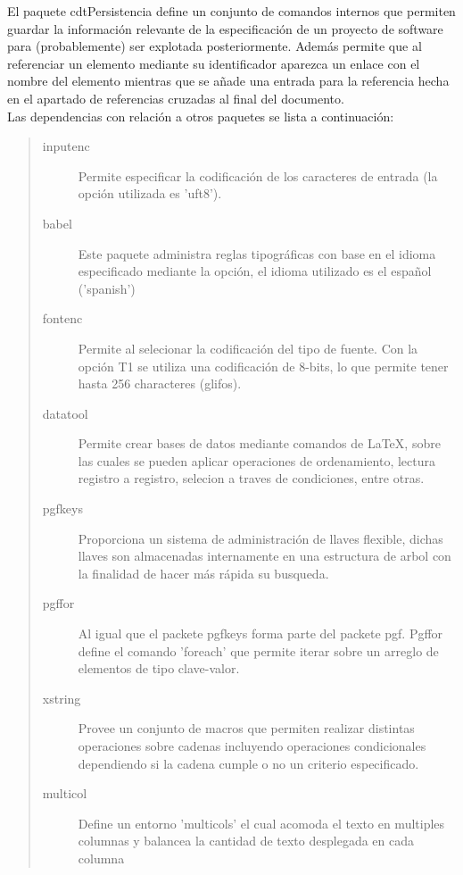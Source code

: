 \label{ch:persistencia}

El paquete cdtPersistencia define un conjunto de comandos internos que permiten guardar la información relevante de la especificación de un proyecto de software para (probablemente) ser explotada posteriormente. Además permite que al referenciar un elemento mediante su identificador aparezca un enlace con el nombre del elemento mientras que se añade una entrada para la referencia hecha en el apartado de referencias cruzadas al final del documento.\\

\noindent Las dependencias con relación a otros paquetes se lista a continuación:
        
    \begin{quote}
    \begin{description}
        \item[inputenc] Permite especificar la codificación de los caracteres de entrada (la opción utilizada es 'uft8').
        
        \item[babel] Este paquete administra reglas tipográficas con base en el idioma especificado mediante la opción, el idioma utilizado es el español ('spanish')
        
        \item[fontenc] Permite al selecionar la codificación del tipo de fuente. Con la opción T1 se utiliza una codificación de 8-bits, lo que permite tener hasta 256 characteres (glifos).
        
        \item[datatool] Permite crear bases de datos mediante comandos de LaTeX, sobre las cuales se pueden aplicar operaciones de ordenamiento, lectura registro a registro, selecion a traves de condiciones, entre otras.
        
        \item[pgfkeys] Proporciona un sistema de administración de llaves flexible, dichas llaves son almacenadas internamente en una estructura de arbol con la finalidad de hacer más rápida su busqueda.
        
        \item[pgffor] Al igual que el packete pgfkeys forma parte del packete pgf. Pgffor define el comando 'foreach' que permite iterar sobre un arreglo de elementos de tipo clave-valor.
        
        \item[xstring] Provee un conjunto de macros que permiten realizar distintas operaciones sobre cadenas incluyendo operaciones condicionales dependiendo si la cadena cumple o no un criterio especificado.
        
        \item[multicol] Define un entorno 'multicols' el cual acomoda el texto en multiples columnas y balancea la cantidad de texto desplegada en cada columna
        
    \end{description}
    \end{quote}


